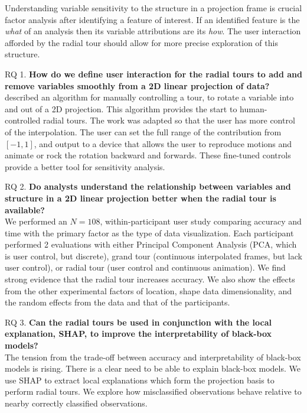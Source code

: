 \documentclass{template/monashthesis}
\begin{document}
Understanding variable sensitivity to the structure in a projection frame is crucial factor analysis after identifying a feature of interest. If an identified feature is the \emph{what} of an analysis then its variable attributions are its \emph{how}. The user interaction afforded by the radial tour should allow for more precise exploration of this structure.

RQ 1. \textbf{How do we define user interaction for the radial tours to add and remove variables smoothly from a 2D linear projection of data?}\\
\textcite{cook_manual_1997} described an algorithm for manually controlling a tour, to rotate a variable into and out of a 2D projection. This algorithm provides the start to human-controlled radial tours. The work \autocite{spyrison_spinifex_2020} was adapted so that the user has more control of the interpolation. The user can set the full range of the contribution from \([-1, 1]\), and output to a device that allows the user to reproduce motions and animate or rock the rotation backward and forwards. These fine-tuned controls provide a better tool for sensitivity analysis.

RQ 2. \textbf{Do analysts understand the relationship between variables and structure in a 2D linear projection better when the radial tour is available?}\\
We performed an \(N=108\), within-participant user study comparing accuracy and time with the primary factor as the type of data visualization. Each participant performed 2 evaluations with either Principal Component Analysis (PCA, which is user control, but discrete), grand tour (continuous interpolated frames, but lack user control), or radial tour (user control and continuous animation). We find strong evidence that the radial tour increases accuracy. We also show the effects from the other experimental factors of location, shape data dimensionality, and the random effects from the data and that of the participants.

RQ 3. \textbf{Can the radial tours be used in conjunction with the local explanation, SHAP, to improve the interpretability of black-box models?}\\
The tension from the trade-off between accuracy and interpretability of black-box models is rising. There is a clear need to be able to explain black-box models. We use SHAP to extract local explanations which form the projection basis to perform radial tours. We explore how misclassified observations behave relative to nearby correctly classified observations.
\end{document}
